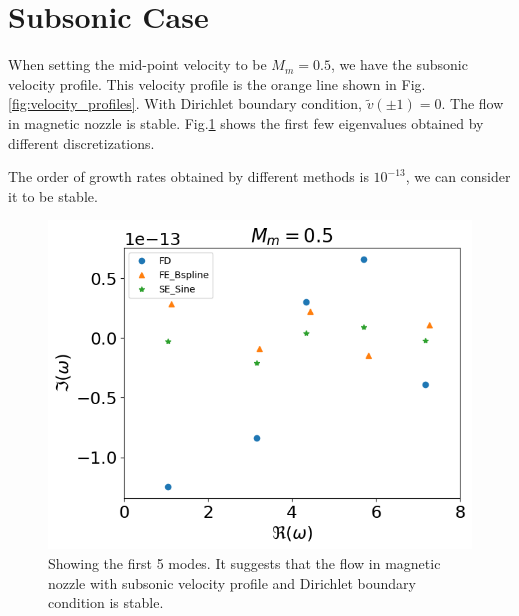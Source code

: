 \section{Subsonic Case}
When setting the mid-point velocity to be $M_m=0.5$, we have the subsonic velocity profile. This velocity profile is the orange line shown in Fig.\ref{fig:velocity_profiles}. With Dirichlet boundary condition, $\tilde{v}(\pm 1) =0$. The flow in magnetic nozzle is stable. Fig.\ref{fig:subsonic_v} shows the first few eigenvalues obtained by different discretizations. 

The order of growth rates obtained by different methods is $10^{-13}$, we can consider it to be stable.
\begin{figure} [H]
	\centering
	\includegraphics[width=0.7\linewidth]{img/numerical_experiments/subsonic_v}
	\caption{Showing the first 5 modes. It suggests that the flow in magnetic nozzle with subsonic velocity profile and Dirichlet boundary condition is stable.}
	\label{fig:subsonic_v}
\end{figure}


